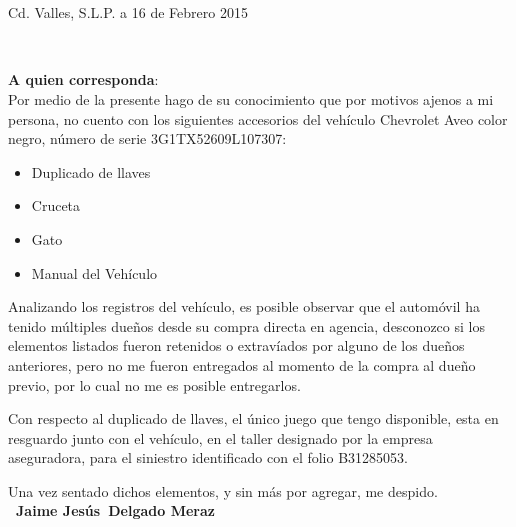 \documentclass[11pt]{article}
\def\firstname{Jaime Jesús}
\def\familyname{Delgado Meraz}
\def\FileAuthor{\firstname~\familyname}
\begin{document}
\sffamily   %
\hfill%
\begin{minipage}[t]{.6\textwidth}
\raggedleft%
~\\[.35ex]
\small\itshape%
\end{minipage}\\[1em]
%
\begin{minipage}[t]{.4\textwidth}
\end{minipage}
\hfill %
\begin{minipage}[t]{.4\textwidth}
\raggedleft %
Cd. Valles, S.L.P. a 16 de Febrero 2015
\end{minipage}\\[2em]
\raggedright
\textbf{A quien corresponda}:\\[1.5em]

Por medio de la presente hago de su conocimiento que por motivos ajenos a mi persona, no cuento con los siguientes accesorios del vehículo Chevrolet Aveo color negro, número de serie 3G1TX52609L107307:
\begin{itemize}
  \item Duplicado de llaves
  \item Cruceta
  \item Gato
  \item Manual del Vehículo
\end{itemize}

Analizando los registros del vehículo, es posible observar que el automóvil ha tenido múltiples dueños desde su compra directa en agencia, desconozco si los elementos listados fueron retenidos o extravíados por alguno de los dueños anteriores, pero no me fueron entregados al momento de la compra al dueño previo, por lo cual no me es posible entregarlos.

Con respecto al duplicado de llaves, el único juego que tengo disponible, esta en resguardo junto con el vehículo, en el taller designado por la empresa aseguradora, para el siniestro identificado con el folio B31285053.

Una vez sentado dichos elementos, y sin más por agregar, me despido.\\[5em] %
%
{\bfseries~\FileAuthor}\\
%
\vfill%
\end{document}
